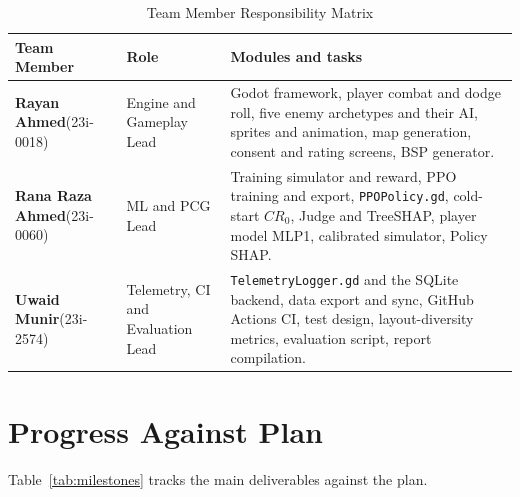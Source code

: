 \begin{table}[!htbp]
\centering
\caption{Team Member Responsibility Matrix}
\label{tab:wbs}
\small
\begin{tabular}{p{}p{}p{}}
\toprule
\textbf{Team Member} & \textbf{Role} & \textbf{Modules and tasks} \\
\midrule
\textbf{Rayan Ahmed}\newline (23i-0018) & Engine and Gameplay Lead & Godot framework, player combat and dodge roll, five enemy archetypes and their AI, sprites and animation, map generation, consent and rating screens, BSP generator. \\
\midrule
\textbf{Rana Raza Ahmed}\newline (23i-0060) & ML and PCG Lead & Training simulator and reward, PPO training and export, \texttt{PPOPolicy.gd}, cold-start $CR_0$, Judge and TreeSHAP, player model MLP1, calibrated simulator, Policy SHAP. \\
\midrule
\textbf{Uwaid Munir}\newline (23i-2574) & Telemetry, CI and Evaluation Lead & \texttt{TelemetryLogger.gd} and the SQLite backend, data export and sync, GitHub Actions CI, test design, layout-diversity metrics, evaluation script, report compilation. \\
\bottomrule
\end{tabular}
\end{table}

\section{Progress Against Plan}
Table~\ref{tab:milestones} tracks the main deliverables against the plan.

